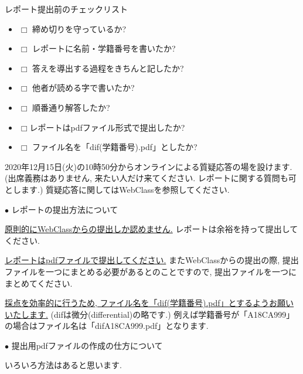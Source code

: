 \documentclass[dvipdfmx,a4paper,11pt]{article}
\theoremstyle{definition}
\begin{document}
 \begin{tcolorbox}[
    colback = white,
    colframe = black,
    fonttitle = \bfseries,
    breakable = true]
    レポート提出前のチェックリスト
    \begin{itemize}
    \item[] $\Box$ 締め切りを守っているか?
    \item[] $\Box$ レポートに名前・学籍番号を書いたか?
     \item[] $\Box$ 答えを導出する過程をきちんと記したか?
    \item[] $\Box$ 他者が読める字で書いたか?
    \item[] $\Box$ 順番通り解答したか?
    \item[] $\Box$レポートはpdfファイル形式で提出したか?
   \item[] $\Box$ ファイル名を「dif(学籍番号).pdf」としたか?
    \end{itemize}

  \end{tcolorbox}
  
2020年12月15日(火)の10時50分からオンラインによる質疑応答の場を設けます. (出席義務はありません, 来たい人だけ来てください. レポートに関する質問も可とします.) 質疑応答に関してはWebClassを参照してください.
 
\newpage
 \hspace{-11pt}
{\Large $\bullet$ レポートの提出方法について }
\vspace{11pt}

\underline{原則的にWebClassからの提出しか認めません.}
レポートは余裕を持って提出してください.
\vspace{11pt}

\underline{レポートはpdfファイルで提出してください.}
またWebClassからの提出の際, 提出ファイルを一つにまとめる必要があるとのことですので, 提出ファイルを一つにまとめてください.
\vspace{11pt}

\underline{採点を効率的に行うため, ファイル名を「dif(学籍番号).pdf」とするようお願いいたします.}
(difは微分(differential)の略です.)
例えば学籍番号が「A18CA999」の場合はファイル名は「difA18CA999.pdf」となります.

\vspace{11pt}
 \hspace{-11pt}
{\Large $\bullet$ 提出用pdfファイルの作成の仕方について}
\vspace{11pt}

いろいろ方法はあると思います.
\vspace{11pt}
\end{document}
